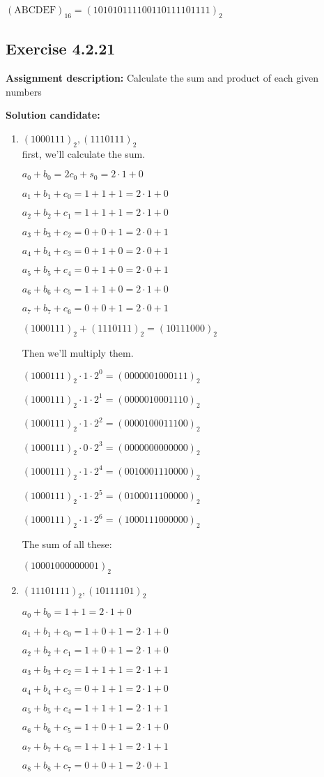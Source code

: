 \documentclass{report}
\newcommand{\cent}[1]{\begin{center}#1\end{center}}
\newcommand{\assignmentDescription}{\textbf{Assignment description: }}
\newcommand{\solution}{\textbf{Solution candidate: }}
\newcommand{\Exercise}[1]{\subsection{Exercise #1}}
\newcommand{\defaultEnumerateLabel}{\textbf{\alph*.}}
\newcommand{\myItem}[1]{\item #1\\}
\newcommand{\binary}[1]{(#1)_2}
\newcommand{\hexadec}[1]{(\text{#1})_{16}}
\begin{document}
\begin{enumerate}[label=\defaultEnumerateLabel]
	\cent{$\hexadec{ABCDEF} = \binary{101010111100110111101111}$}
	
	
	\Exercise{4.2.21}
	
	\assignmentDescription Calculate the sum and product of each given numbers
	
	\solution
	\begin{enumerate}[label=\defaultEnumerateLabel]
		\myItem{$\binary{1000111}, \binary{1110111}$}
		
		first, we'll calculate the sum.\\
		
		\cent{$a_0 + b_0 = 2 c_0 + s_0 = 2 \cdot 1 + 0$}
		\cent{$a_1 + b_1 + c_0 = 1 + 1 + 1 = 2 \cdot 1 + 0$}
		\cent{$a_2 +b_2 + c_1 = 1 + 1 + 1 = 2 \cdot 1 + 0$}
		\cent{ $a_3 + b_3 + c_2 = 0 + 0 + 1 = 2 \cdot 0 + 1$}
		\cent{$a_4 + b_4 + c_3 = 0 + 1 + 0 = 2 \cdot 0 + 1 $}
		\cent{$a_5 + b_5 + c_4 = 0 + 1 + 0 = 2 \cdot 0 + 1$}
		\cent{$a_6 + b_6 + c_5 = 1 + 1 + 0 = 2 \cdot 1 + 0$}
		\cent{$a_7 + b_7 + c_6 = 0 + 0 + 1 = 2 \cdot 0 + 1$}
		
		\cent{$\binary{1000111} + \binary{1110111} = \binary{10111000}$}
		
		Then we'll multiply them.\\
		
		\cent{$\binary{1000111} \cdot 1 \cdot 2^0 = \binary{0000001000111}$}
		\cent{$\binary{1000111} \cdot 1 \cdot 2^1 = \binary{0000010001110}$}
		\cent{$\binary{1000111} \cdot 1 \cdot 2^2 = \binary{0000100011100}$}
		\cent{$\binary{1000111} \cdot 0 \cdot 2^3 = \binary{0000000000000}$}
		\cent{$\binary{1000111} \cdot 1 \cdot 2^4 = \binary{0010001110000}$}
		\cent{$\binary{1000111} \cdot 1 \cdot 2^5 = \binary{0100011100000}$}
		\cent{$\binary{1000111} \cdot 1 \cdot 2^6 = \binary{1000111000000}$}
		The sum of all these:
		\cent{$\binary{10001000000001}$}
		
		\myItem{$\binary{11101111}, \binary{10111101}$}
		
		\cent{$a_0 + b_0 = 1 + 1 = 2 \cdot 1 + 0$}
		\cent{$a_1 + b_1 + c_0 = 1 + 0 +1 = 2 \cdot 1 + 0 $}
		\cent{$a_2 + b_2 + c_1 = 1 + 0 +1 = 2 \cdot 1 + 0 $}
		\cent{$a_3 + b_3 + c_2 = 1 + 1 +1 = 2 \cdot 1 + 1 $}
		\cent{$a_4 + b_4 + c_3 = 0 + 1 +1 = 2 \cdot 1 + 0 $}
		\cent{$a_5 + b_5 + c_4 = 1 + 1 +1 = 2 \cdot 1 + 1 $}
		\cent{$a_6 + b_6 + c_5 = 1 + 0 +1 = 2 \cdot 1 + 0 $}
		\cent{$a_7 + b_7 + c_6 = 1 + 1 +1 = 2 \cdot 1 + 1 $}
		\cent{$a_8 + b_8 + c_7 = 0 + 0 +1 = 2 \cdot 0 + 1 $}
		

\end{enumerate}
\end{enumerate}
\end{document}
